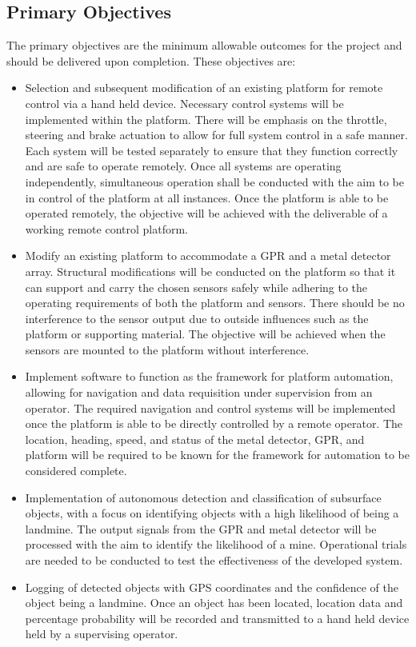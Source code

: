 \documentclass[main.tex]{subfiles}
\begin{document}
\subsection{Primary Objectives}
The primary objectives are the minimum allowable outcomes for the project and should be delivered upon completion. These objectives are:
\begin{itemize}
\item Selection and subsequent modification of an existing platform for remote control via a hand held device. Necessary control systems will be implemented within the platform. There will be emphasis on the throttle, steering and brake actuation to allow for full system control in a safe manner. Each system will be tested separately to ensure that they function correctly and are safe to operate remotely. Once all systems are operating independently, simultaneous operation shall be conducted with the aim to be in control of the platform at all instances. Once the platform is able to be operated remotely, the objective will be achieved with the deliverable of a working remote control platform.

\item Modify an existing platform to accommodate a GPR and a metal detector array. Structural modifications will be conducted on the platform so that it can support and carry the chosen sensors safely while adhering to the operating requirements of both the platform and sensors. There should be no interference to the sensor output due to outside influences such as the platform or supporting material. The objective will be achieved when the sensors are mounted to the platform without interference.

\item Implement software to function as the framework for platform automation, allowing for navigation and data requisition under supervision from an operator. The required navigation and control systems will be implemented once the platform is able to be directly controlled by a remote operator. The location, heading, speed, and status of the metal detector, GPR, and platform will be required to be known for the framework for automation to be considered complete.

\item Implementation of autonomous detection and classification of subsurface objects, with a focus on identifying objects with a high likelihood of being a landmine. The output signals from the GPR and metal detector will be processed with the aim to identify the likelihood of a mine. Operational trials are needed to be conducted to test the effectiveness of the developed system. 

\item Logging of detected objects with GPS coordinates and the confidence of the object being a landmine. Once an object has been located, location data and percentage probability will be recorded and transmitted to a hand held device held by a supervising operator.
\end{itemize}
\end{document}

